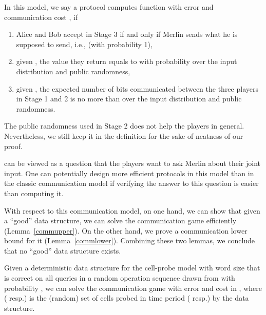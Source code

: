 \documentclass[11pt]{article}
\begin{document}
In this model, we say a protocol computes function  with error  and communication cost , if 
\begin{enumerate}
	\item
		Alice and Bob accept in Stage 3 if and only if Merlin sends what he is supposed to send, i.e.,  (with probability 1),
	\item
		given , the value  they return equals to  with probability  over the input distribution and public randomness,
	\item
		given , the expected number of bits communicated between the three players in Stage 1 and 2 is no more than  over the input distribution and public randomness.
\end{enumerate}


\begin{remark}
The public randomness used in Stage 2 does not help the players in general. Nevertheless, we still keep it in the definition for the sake of neatness of our proof. 
\end{remark}

 can be viewed as a question that the players want to ask Merlin about their joint input. One can potentially design more efficient protocols in this model than in the classic communication model if verifying the answer to this question is easier than computing it. 

With respect to this communication model, on one hand, we can show that given a ``good'' \bps{} data structure, we can solve the communication game efficiently (Lemma~\ref{commupper}). On the other hand, we prove a communication lower bound for it (Lemma~\ref{commlower}). Combining these two lemmas, we conclude that no ``good'' data structure exists. 

\begin{lemma}\label{commupper}
Given a deterministic \bps{} data structure for the cell-probe model with word size  that is correct on all queries in a random operation sequence drawn from  with probability , we can solve the communication game  with error  and cost  in \mm{}, where  ( resp.) is the (random) set of cells probed in time period  ( resp.) by the data structure. 
\end{lemma}
\end{document}
